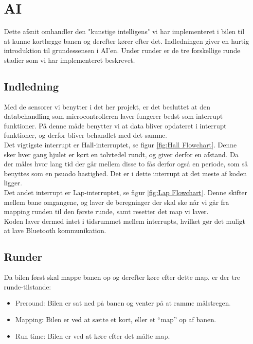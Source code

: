 \section{AI}
Dette afsnit omhandler den "kunstige intelligens" vi har implementeret i bilen til at kunne kortlægge banen og derefter kører efter det. Indledningen giver en hurtig introduktion til grundessensen i AI'en. Under runder er de tre forskellige runde stadier som vi har implementeret beskrevet.


\subsection{Indledning}
Med de sensorer vi benytter i det her projekt, er det besluttet at den databehandling som microcontrolleren laver fungerer bedst som interrupt funktioner. På denne måde benytter vi at data bliver opdateret i interrupt funktioner, og derfor bliver behandlet med det samme.
\\

Det vigtigste interrupt er Hall-interruptet, se figur \ref{fig:Hall Flowchart}. Denne sker hver gang hjulet er kørt en tolvtedel rundt, og giver derfor en afstand. Da der måles hvor lang tid der går mellem disse to fås derfor også en periode, som så benyttes som en psuodo hastighed. Det er i dette interrupt at det meste af koden ligger.
\\

Det andet interrupt er Lap-interruptet, se figur \ref{fig:Lap Flowchart}. Denne skifter mellem bane omgangene, og laver de beregninger der skal ske når vi går fra mapping runden til den første runde, samt resetter det map vi laver.
\\

Koden laver dermed intet  i tidsrummet mellem interrupts, hvilket gør det muligt at lave Bluetooth kommunikation.

\subsection{Runder}

Da bilen først skal mappe banen op og derefter køre efter dette map, er der tre runde-tilstande:

\begin{itemize}
\item Preround: Bilen er sat ned på banen og venter på at ramme målstregen.
\item Mapping: Bilen er ved at sætte et kort, eller et ``map'' op af banen.
\item Run time: Bilen er ved at køre efter det målte map.
\end{itemize}

